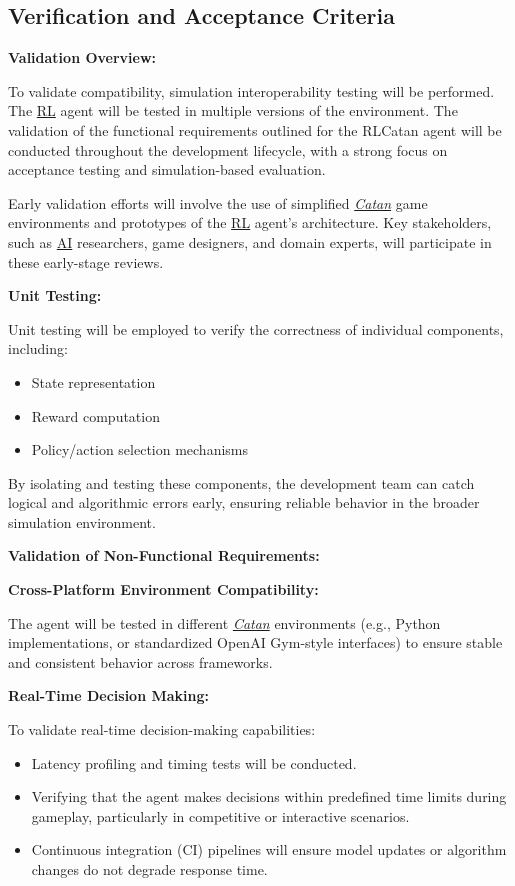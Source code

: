 \documentclass{article}
\newcommand{\Catan}{\href{https://en.wikipedia.org/wiki/Catan}{Catan}}
\newcommand{\AI}{\href{https://en.wikipedia.org/wiki/Artificial_intelligence}{AI}}
\newcommand{\RL}{\href{https://www.ibm.com/think/topics/reinforcement-learning}{RL}}
\begin{document}
\subsection{Verification and Acceptance Criteria}\label{subsec:verification-and-acceptance-criteria}

\noindent\textbf{Validation Overview:}

To validate compatibility, simulation interoperability testing will be performed. The \RL{} agent will be tested in multiple versions of the environment. The validation of the functional requirements outlined for the RLCatan agent will be conducted throughout the development lifecycle, with a strong focus on acceptance testing and simulation-based evaluation.

Early validation efforts will involve the use of simplified \emph{\Catan{}} game environments and prototypes of the \RL{} agent's architecture. Key stakeholders, such as \AI{} researchers, game designers, and domain experts, will participate in these early-stage reviews.

\noindent\textbf{Unit Testing:}

Unit testing will be employed to verify the correctness of individual components, including:
\begin{itemize}
    \item State representation
    \item Reward computation
    \item Policy/action selection mechanisms
\end{itemize}

By isolating and testing these components, the development team can catch logical and algorithmic errors early, ensuring reliable behavior in the broader simulation environment.

\noindent\textbf{Validation of Non-Functional Requirements:}

\noindent\textbf{Cross-Platform Environment Compatibility:}

The agent will be tested in different \emph{\Catan{}} environments (e.g., Python implementations, or standardized OpenAI Gym-style interfaces) to ensure stable and consistent behavior across frameworks.

\noindent\textbf{Real-Time Decision Making:}

To validate real-time decision-making capabilities:
\begin{itemize}
    \item Latency profiling and timing tests will be conducted.
    \item Verifying that the agent makes decisions within predefined time limits during gameplay, particularly in competitive or interactive scenarios.
    \item Continuous integration (CI) pipelines will ensure model updates or algorithm changes do not degrade response time.
\end{itemize}
\end{document}
